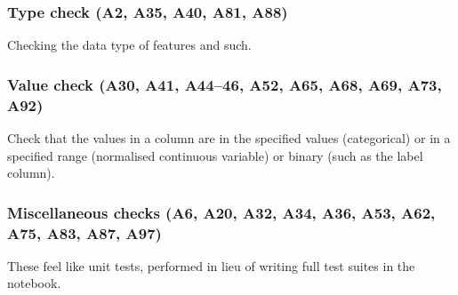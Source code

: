 \subsubsection{Type check (A2, A35, A40, A81, A88)}

Checking the data type of features and such.

\subsubsection{Value check (A30, A41, A44--46, A52, A65, A68, A69, A73, A92)}

Check that the values in a column are in the specified values (categorical) or in a specified range (normalised continuous variable) or binary (such as the label column).

\subsubsection{Miscellaneous checks (A6, A20, A32, A34, A36, A53, A62, A75, A83, A87, A97)}

These feel like unit tests, performed in lieu of writing full test suites in the notebook.



%
%





